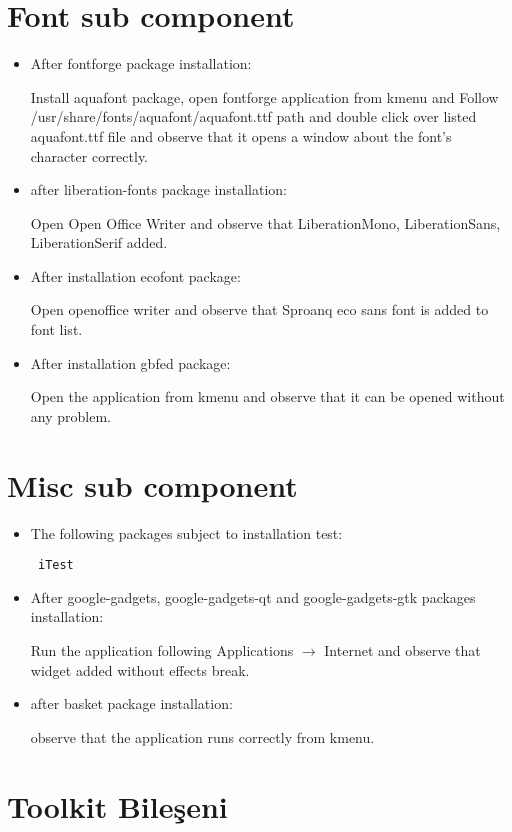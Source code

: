 \documentclass[a4paper,10pt]{article}
\begin{document}
\section{Font sub component}
\begin{itemize}
 \item After fontforge package installation:

Install aquafont package, open fontforge application from kmenu and Follow /usr/share/fonts/aquafont/aquafont.ttf path and double click over listed aquafont.ttf file and observe that it opens a window about the font's character correctly.
\item after liberation-fonts package installation:

Open Open Office Writer and observe that LiberationMono, LiberationSans, LiberationSerif added.

\item After installation ecofont package:

Open openoffice writer and observe that Sproanq eco sans font is added to font list.
\item After installation gbfed package:

Open the application from kmenu and observe that it can be opened without any problem.
\end{itemize}

\section{Misc sub component}
\begin{itemize}
\item The following packages subject to installation test:
\begin{verbatim}
 iTest
\end{verbatim}
\item After google-gadgets, google-gadgets-qt and google-gadgets-gtk packages installation:

Run the application following Applications $\rightarrow$ Internet and observe that widget added without effects break.

\item after basket package installation:

observe that the application runs correctly from kmenu.

\end{itemize}

\section{Toolkit Bileşeni}
\end{document}

